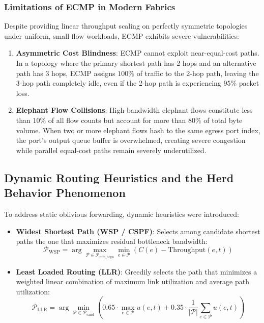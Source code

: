 \documentclass[12pt,a4paper,oneside]{report}
\begin{document}
\subsubsection{Limitations of ECMP in Modern Fabrics}
Despite providing linear throughput scaling on perfectly symmetric topologies under uniform, small-flow workloads, ECMP exhibits severe vulnerabilities:
\begin{enumerate}
    \item \textbf{Asymmetric Cost Blindness}: ECMP cannot exploit near-equal-cost paths. In a topology where the primary shortest path has 2 hops and an alternative path has 3 hops, ECMP assigns $100\%$ of traffic to the 2-hop path, leaving the 3-hop path completely idle, even if the 2-hop path is experiencing $95\%$ packet loss.
    \item \textbf{Elephant Flow Collisions}: High-bandwidth elephant flows constitute less than $10\%$ of all flow counts but account for more than $80\%$ of total byte volume. When two or more elephant flows hash to the same egress port index, the port's output queue buffer is overwhelmed, creating severe congestion while parallel equal-cost paths remain severely underutilized.
\end{enumerate}

\subsection{Dynamic Routing Heuristics and the Herd Behavior Phenomenon}
To address static oblivious forwarding, dynamic heuristics were introduced:
\begin{itemize}
    \item \textbf{Widest Shortest Path (WSP / CSPF)}: Selects among candidate shortest paths the one that maximizes residual bottleneck bandwidth:
    \begin{equation}
        \mathcal{P}_{\text{WSP}} = \arg\max_{\mathcal{P} \in \mathcal{P}_{\text{min\_hops}}} \min_{e \in \mathcal{P}} \left( C(e) - \text{Throughput}(e, t) \right)
    \end{equation}
    \item \textbf{Least Loaded Routing (LLR)}: Greedily selects the path that minimizes a weighted linear combination of maximum link utilization and average path utilization:
    \begin{equation}
        \mathcal{P}_{\text{LLR}} = \arg\min_{\mathcal{P} \in \mathcal{P}_{\text{cand}}} \left( 0.65 \cdot \max_{e \in \mathcal{P}} u(e, t) + 0.35 \cdot \frac{1}{|\mathcal{P}|}\sum_{e \in \mathcal{P}} u(e, t) \right)
    \end{equation}
\end{itemize}
\end{document}
